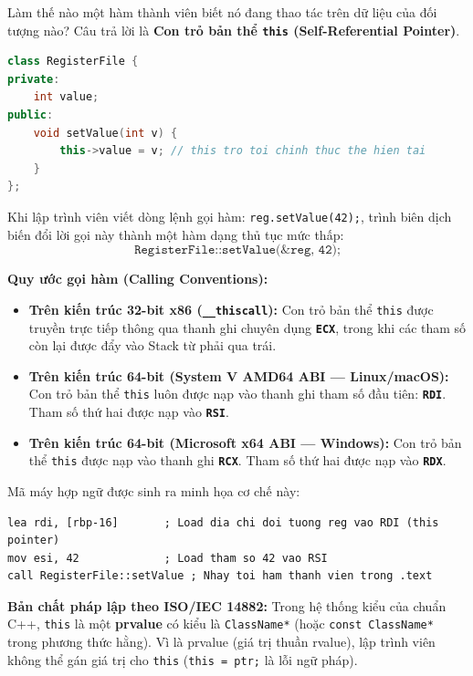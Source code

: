 \documentclass[12pt,a4paper,oneside]{book}
\begin{document}
Làm thế nào một hàm thành viên biết nó đang thao tác trên dữ liệu của đối tượng nào? Câu trả lời là \textbf{Con trỏ bản thể \texttt{this} (Self-Referential Pointer)}.

\begin{lstlisting}[language=C++]
class RegisterFile {
private:
    int value;
public:
    void setValue(int v) {
        this->value = v; // this tro toi chinh thuc the hien tai
    }
};
\end{lstlisting}

\begin{underhoodbox}
Khi lập trình viên viết dòng lệnh gọi hàm: \texttt{reg.setValue(42);}, trình biên dịch biến đổi lời gọi này thành một hàm dạng thủ tục mức thấp:
$$\texttt{RegisterFile::setValue(\&reg, 42);}$$

\textbf{Quy ước gọi hàm (Calling Conventions):}
\begin{itemize}
    \item \textbf{Trên kiến trúc 32-bit x86 (\texttt{\_\_thiscall}):} Con trỏ bản thể \texttt{this} được truyền trực tiếp thông qua thanh ghi chuyên dụng \textbf{\texttt{ECX}}, trong khi các tham số còn lại được đẩy vào Stack từ phải qua trái.
    \item \textbf{Trên kiến trúc 64-bit (System V AMD64 ABI --- Linux/macOS):} Con trỏ bản thể \texttt{this} luôn được nạp vào thanh ghi tham số đầu tiên: \textbf{\texttt{RDI}}. Tham số thứ hai được nạp vào \textbf{\texttt{RSI}}.
    \item \textbf{Trên kiến trúc 64-bit (Microsoft x64 ABI --- Windows):} Con trỏ bản thể \texttt{this} được nạp vào thanh ghi \textbf{\texttt{RCX}}. Tham số thứ hai được nạp vào \textbf{\texttt{RDX}}.
\end{itemize}

Mã máy hợp ngữ được sinh ra minh họa cơ chế này:
\begin{lstlisting}[language={[x86masm]Assembler}]
lea rdi, [rbp-16]       ; Load dia chi doi tuong reg vao RDI (this pointer)
mov esi, 42             ; Load tham so 42 vao RSI
call RegisterFile::setValue ; Nhay toi ham thanh vien trong .text
\end{lstlisting}

\textbf{Bản chất pháp lập theo ISO/IEC 14882:}
Trong hệ thống kiểu của chuẩn C++, \texttt{this} là một \textbf{prvalue} có kiểu là \texttt{ClassName*} (hoặc \texttt{const ClassName*} trong phương thức hằng). Vì là prvalue (giá trị thuần rvalue), lập trình viên không thể gán giá trị cho \texttt{this} (\texttt{this = ptr;} là lỗi ngữ pháp).
\end{underhoodbox}
\end{document}

